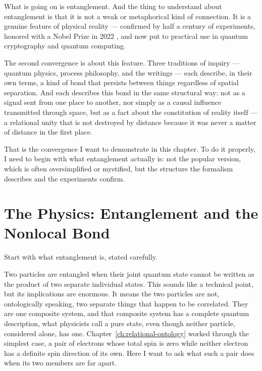 What is going on is entanglement. And the thing to understand about entanglement is that it is not a weak or metaphorical kind of connection. It is a genuine feature of physical reality --- confirmed by half a century of experiments, honored with a Nobel Prize in 2022 \citep{Zeilinger2023Nobel}, and now put to practical use in quantum cryptography and quantum computing.

The second convergence is about this feature. Three traditions of inquiry --- quantum physics, process philosophy, and the \bahai writings --- each describe, in their own terms, a kind of bond that persists between things regardless of spatial separation. And each describes this bond in the same structural way: not as a signal sent from one place to another, nor simply as a causal influence transmitted through space, but as a fact about the constitution of reality itself --- a relational unity that is not destroyed by distance because it was never a matter of distance in the first place.

That is the convergence I want to demonstrate in this chapter. To do it properly, I need to begin with what entanglement actually is: not the popular version, which is often oversimplified or mystified, but the structure the formalism describes and the experiments confirm.

\section{The Physics: Entanglement and the Nonlocal Bond}
\label{sec:ch8-physics}

Start with what entanglement is, stated carefully.

Two particles are entangled when their joint quantum state cannot be written as the product of two separate individual states. This sounds like a technical point, but its implications are enormous. It means the two particles are not, ontologically speaking, two separate things that happen to be correlated. They are one composite system, and that composite system has a complete quantum description, what physicists call a pure state, even though neither particle, considered alone, has one. Chapter~\ref{ch:relational-ontology} worked through the simplest case, a pair of electrons whose total spin is zero while neither electron has a definite spin direction of its own. Here I want to ask what such a pair does when its two members are far apart.

